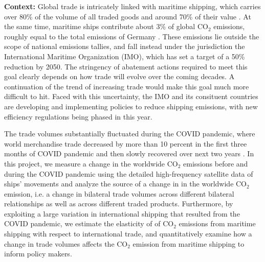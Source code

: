 \documentclass[hidelinks, 12pt,letterpaper]{article}
\begin{document}
\noindent \textbf{Context:} 
Global trade is intricately linked with maritime shipping, which carries over 80\% of the volume of all traded goods and around 70\% of their value \citep{unctad2017review}.
At the same time, maritime ships contribute about 3\% of global CO$_2$ emissions, roughly equal to the total emissions of Germany \citep*{faber2020fourth}. These emissions lie outside the scope of national emissions tallies, and fall instead under the jurisdiction the International Maritime Organization (IMO), which has set a target of a 50\% reduction by 2050. %
The stringency of abatement actions required to meet this goal clearly depends on how trade will evolve over the coming decades. A continuation of the trend of increasing trade would make this goal much more difficult to hit. Faced with this uncertainty, the IMO and its consituent countries are developing and implementing policies to reduce shipping emissions, with new efficiency regulations being phased in this year. 
 

The trade volumes substantially fluctuated during the COVID pandemic, where  world merchandise trade decreased by more than 10 percent in the first three months of COVID pandemic  and then slowly recovered over next two years \citep{oecd21}. %
In this project, we measure a change in the worldwide CO$_2$ emissions before and during the COVID pandemic using the detailed high-frequency satellite data of ships' movements and analyze the source of a change in  in the worldwide CO$_2$ emission, i.e. a change in bilateral trade volumes across different bilateral relationships as well as across different traded products. Furthermore, by exploiting a large variation in international shipping that resulted from the COVID pandemic, we estimate the elasticity of of CO$_2$ emissions from maritime shipping with respect to international trade, and  quantitatively examine how a change in trade volumes affects the CO$_2$ emission from maritime shipping to inform policy makers.  %
\end{document}
